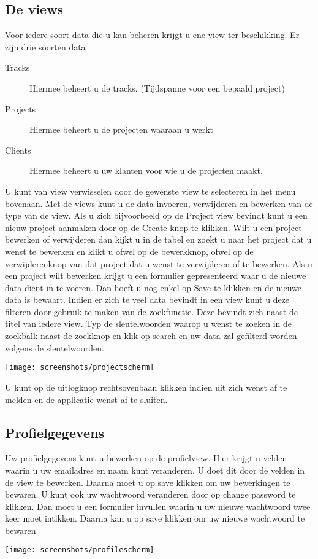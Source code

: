 \documentclass[a4paper,11pt]{article}
\begin{document}
\subsection{De views}
Voor iedere soort data die u kan beheren krijgt u ene view ter beschikking. Er zijn drie soorten data
\begin{description}
\item[Tracks] Hiermee beheert u de tracks. (Tijdspanne voor een bepaald project)
\item[Projects] Hiermee beheert u de projecten waaraan u werkt
\item[Clients] Hiermee beheert u uw klanten voor wie u de projecten maakt.
\end{description}

U kunt van view verwisselen door de gewenste view te selecteren in het menu bovenaan. Met de views kunt u de data invoeren, verwijderen en bewerken van de type van de view. Als u zich bijvoorbeeld op de Project view bevindt kunt u een nieuw project aanmaken door op de Create knop te klikken. Wilt u een project bewerken of verwijderen dan kijkt u in de tabel en zoekt u naar het project dat u wenst te bewerken en klikt u ofwel op de bewerkknop, ofwel op de verwijderenknop van dat project dat u wenst te verwijderen of te bewerken. Als u een project wilt bewerken krijgt u een formulier gepresenteerd waar u de nieuwe data dient in te voeren. Dan hoeft u nog enkel op Save te klikken en de nieuwe data is bewaart. Indien er zich te veel data bevindt in een view kunt u deze filteren door gebruik te maken van de zoekfunctie. Deze bevindt zich naast de titel van iedere view. Typ de sleutelwoorden waarop u wenst te zoeken in de zoekbalk naast de zoekknop en klik op search en uw data zal gefilterd worden volgens de sleutelwoorden.
\begin{center}
\begin{minipage}{\linewidth}
\centering
\texttt{[image: screenshots/projectscherm]}
\end{minipage}
\end{center}
U kunt op de uitlogknop rechtsovenbaan klikken indien uit zich wenst af te melden en de applicatie wenst af te sluiten. 

\subsection{Profielgegevens}
Uw profielgegevens kunt u bewerken op de profielview. Hier krijgt u velden waarin u uw emailadres en naam kunt veranderen. U doet dit door de velden in de view te bewerken. Daarna moet u op save klikken om uw bewerkingen te bewaren. U kunt ook uw wachtwoord veranderen door op change password te klikken. Dan moet u een formulier invullen waarin u uw nieuwe wachtwoord twee keer moet intikken. Daarna kan u op save klikken om uw nieuwe wachtwoord te bewaren
\begin{center}
\begin{minipage}{\linewidth}
\centering
\texttt{[image: screenshots/profilescherm]}
\end{minipage}
\end{center}
\end{document}

